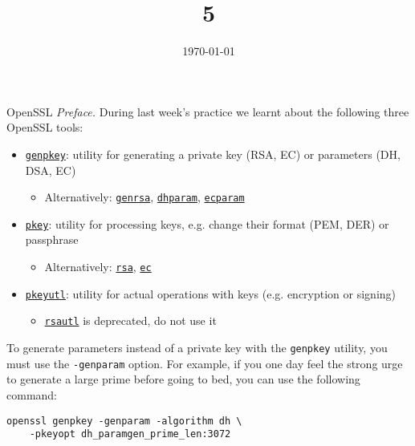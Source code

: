 \documentclass{practice}
\title{5}
\date{\today}
\begin{document}
\maketitle

\begin{task}{OpenSSL}
  \textit{Preface.}
  During last week's practice we learnt about the following three OpenSSL tools:
  \begin{itemize}
    \item \href{https://docs.openssl.org/master/man1/openssl-genpkey/}{\texttt{genpkey}}: utility for generating a private key (RSA, EC) or parameters (DH, DSA, EC)
    \begin{itemize}
      \item Alternatively: \href{https://docs.openssl.org/master/man1/openssl-genrsa/}{\texttt{genrsa}}, \href{https://docs.openssl.org/master/man1/openssl-dhparam/}{\texttt{dhparam}}, \href{https://docs.openssl.org/master/man1/openssl-ecparam/}{\texttt{ecparam}}
    \end{itemize}
    \item \href{https://docs.openssl.org/master/man1/openssl-pkey/}{\texttt{pkey}}: utility for processing keys, e.g. change their format (PEM, DER) or passphrase
    \begin{itemize}
      \item Alternatively: \href{https://docs.openssl.org/master/man1/openssl-rsa/}{\texttt{rsa}}, \href{https://docs.openssl.org/master/man1/openssl-ec}{\texttt{ec}}
    \end{itemize}
    \item \href{https://docs.openssl.org/master/man1/openssl-pkeyutl/}{\texttt{pkeyutl}}: utility for actual operations with keys (e.g. encryption or signing)
    \begin{itemize}
      \item \href{https://docs.openssl.org/master/man1/openssl-rsautl/}{\texttt{rsautl}} is deprecated, do not use it
    \end{itemize}
  \end{itemize}

  To generate parameters instead of a private key with the \texttt{genpkey} utility, you must use the \texttt{-genparam} option.
  For example, if you one day feel the strong urge to generate a large prime before going to bed, you can use the following command:
  \begin{Verbatim}
openssl genpkey -genparam -algorithm dh \
    -pkeyopt dh_paramgen_prime_len:3072
  \end{Verbatim}


\end{task}
\end{document}
